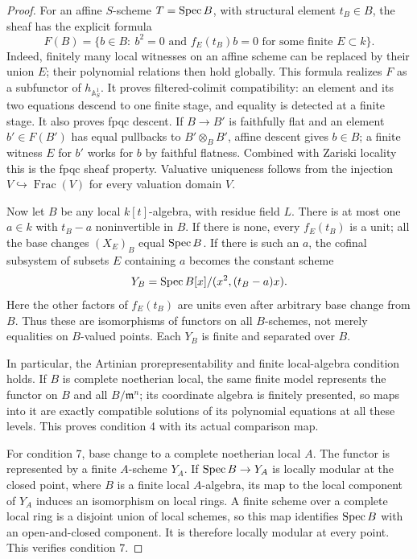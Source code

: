 \begin{proof}
For an affine $S$-scheme $T=\operatorname{Spec} B$, with structural element $t_B\in B$,
the sheaf has the explicit formula
\[
 F(B)=\{b\in B:\ b^2=0\text{ and }f_E(t_B)b=0
                 \text{ for some finite }E\subset k\}.
\]
Indeed, finitely many local witnesses on an affine scheme can be replaced
by their union $E$; their polynomial relations then hold globally.
This formula realizes $F$ as a subfunctor of $h_{\mathbb A^1_S}$.
It proves filtered-colimit compatibility: an element and its two equations
descend to one finite stage, and equality is detected at a finite stage.
It also proves fpqc descent. If $B\to B'$ is faithfully flat and an element
$b'\in F(B')$ has equal pullbacks to $B'\otimes_B B'$, affine descent
gives $b\in B$; a finite witness $E$ for $b'$ works for $b$ by faithful
flatness. Combined with Zariski locality this is the fpqc sheaf property.
Valuative uniqueness follows from the injection $V\hookrightarrow
\operatorname{Frac}(V)$ for every valuation domain $V$.

Now let $B$ be any local $k[t]$-algebra, with residue field $L$.
There is at most one $a\in k$ with $t_B-a$ noninvertible in $B$.
If there is none, every $f_E(t_B)$ is a unit; all the base changes
$(X_E)_B$ equal $\operatorname{Spec} B$. If there is such an $a$, the cofinal subsystem
of subsets $E$ containing $a$ becomes the constant scheme
\[
 Y_B=\operatorname{Spec} B[x]/(x^2,(t_B-a)x).
\]
Here the other factors of $f_E(t_B)$ are units even after arbitrary
base change from $B$. Thus these are isomorphisms of functors on all
$B$-schemes, not merely equalities on $B$-valued points. Each $Y_B$ is
finite and separated over $B$.

In particular, the Artinian prorepresentability and finite local-algebra
condition holds. If $B$ is complete noetherian local, the same finite
model represents the functor on $B$ and all $B/\mathfrak m^n$; its
coordinate algebra is finitely presented, so maps into it are exactly
compatible solutions of its polynomial equations at all these levels.
This proves condition 4 with its actual comparison map.

For condition 7, base change to a complete noetherian local $A$.
The functor is represented by a finite $A$-scheme $Y_A$. If
$\operatorname{Spec} B\to Y_A$ is locally modular at the closed point, where
$B$ is a finite local $A$-algebra, its map to the local component of
$Y_A$ induces an isomorphism on local rings. A finite scheme over a
complete local ring is a disjoint union of local schemes, so this map
identifies $\operatorname{Spec} B$ with an open-and-closed component. It is therefore
locally modular at every point. This verifies condition 7.


\end{proof}
